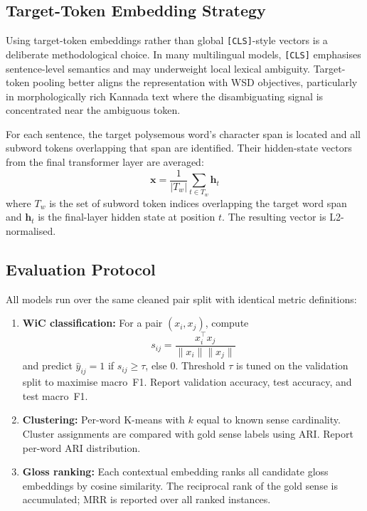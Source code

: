 \documentclass{ieeeaccess}
\begin{document}
\subsection{Target-Token Embedding Strategy}

Using target-token embeddings rather than global \texttt{[CLS]}-style vectors
is a deliberate methodological choice.
In many multilingual models, \texttt{[CLS]} emphasises sentence-level
semantics and may underweight local lexical ambiguity.
Target-token pooling better aligns the representation with WSD objectives,
particularly in morphologically rich Kannada text where the disambiguating
signal is concentrated near the ambiguous token.

For each sentence, the target polysemous word's character span is located
and all subword tokens overlapping that span are identified.
Their hidden-state vectors from the final transformer layer are averaged:
\[
\mathbf{x} = \frac{1}{|T_w|}\sum_{t \in T_w} \mathbf{h}_t
\]
where $T_w$ is the set of subword token indices overlapping the target word
span and $\mathbf{h}_t$ is the final-layer hidden state at position $t$.
The resulting vector is L2-normalised.

\subsection{Evaluation Protocol}

All models run over the same cleaned pair split with identical metric
definitions:
\begin{enumerate}
  \item \textbf{WiC classification:} For a pair $(x_i, x_j)$, compute
        \[
        s_{ij} = \frac{x_i^\top x_j}{\|x_i\|\|x_j\|}
        \]
        and predict $\hat{y}_{ij}=1$ if $s_{ij}\geq\tau$, else $0$.
        Threshold $\tau$ is tuned on the validation split to maximise macro~F1.
        Report validation accuracy, test accuracy, and test macro~F1.
  \item \textbf{Clustering:} Per-word K-means with $k$ equal to known sense
        cardinality.
        Cluster assignments are compared with gold sense labels using ARI.
        Report per-word ARI distribution.
  \item \textbf{Gloss ranking:} Each contextual embedding ranks all candidate
        gloss embeddings by cosine similarity.
        The reciprocal rank of the gold sense is accumulated; MRR is reported
        over all ranked instances.
\end{enumerate}
\end{document}
